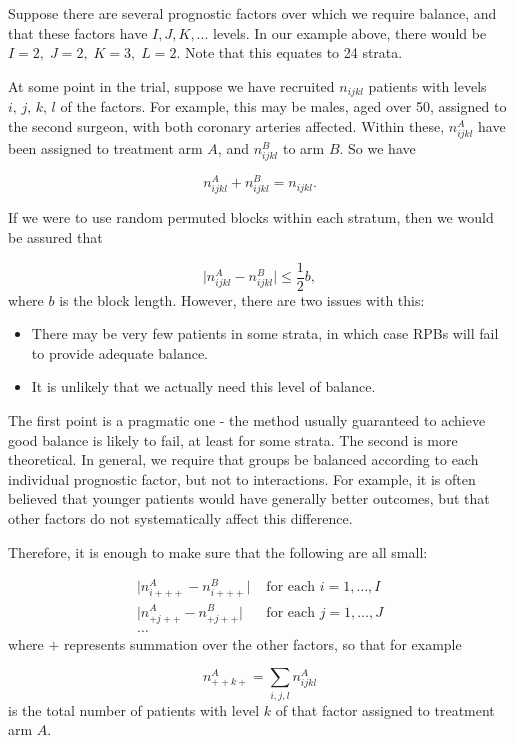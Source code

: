 \documentclass[
  openany]{book}
\providecommand{\tightlist}{%
  \setlength{\itemsep}{0pt}\setlength{\parskip}{0pt}}
\theoremstyle{definition}
\theoremstyle{definition}
\theoremstyle{definition}
\theoremstyle{definition}
\theoremstyle{remark}
\begin{document}
Suppose there are several prognostic factors over which we require balance, and that these factors have \(I, J, K, ...\) levels. In our example above, there would be \(I=2,\; J=2,\; K=3,\; L=2\). Note that this equates to 24 strata.

At some point in the trial, suppose we have recruited \(n_{ijkl}\) patients with levels \(i,\,j,\,k,\,l\) of the factors. For example, this may be males, aged over 50, assigned to the second surgeon, with both coronary arteries affected. Within these, \(n^A_{ijkl}\) have been assigned to treatment arm \(A\), and \(n^B_{ijkl}\) to arm \(B\). So we have

\[ n^A_{ijkl} + n^B_{ijkl} = n_{ijkl} .\]

If we were to use random permuted blocks within each stratum, then we would be assured that

\[\lvert n^A_{ijkl} - n^B_{ijkl} \rvert \leq{\frac{1}{2}b},\]
where \(b\) is the block length. However, there are two issues with this:

\begin{itemize}
\tightlist
\item
  There may be very few patients in some strata, in which case RPBs will fail to provide adequate balance.
\item
  It is unlikely that we actually need this level of balance.
\end{itemize}

The first point is a pragmatic one - the method usually guaranteed to achieve good balance is likely to fail, at least for some strata. The second is more theoretical. In general, we require that groups be balanced according to each individual prognostic factor, but not to interactions. For example, it is often believed that younger patients would have generally better outcomes, but that other factors do not systematically affect this difference.

Therefore, it is enough to make sure that the following are all small:

\[
\begin{aligned}
\lvert n^A_{i+++} - n^B_{i+++} \rvert&\text{ for each }i=1,\ldots,I\\
\lvert n^A_{+j++} - n^B_{+j++} \rvert&\text{ for each }j=1,\ldots,J\\
\ldots&
\end{aligned}
\]
where \(+\) represents summation over the other factors, so that for example

\[n^A_{++k+} = \sum\limits_{i,j,l}{n^A_{ijkl}}\]
is the total number of patients with level \(k\) of that factor assigned to treatment arm \(A\).
\end{document}

